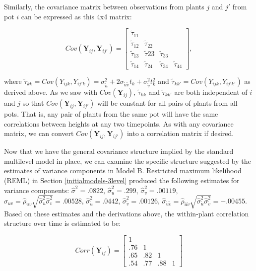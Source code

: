 \documentclass[
]{krantz}
\begin{document}
Similarly, the covariance matrix between observations from plants \(j\) and \(j'\) from pot \(i\) can be expressed as this 4x4 matrix:

\[  Cov(\textbf{Y}_{ij},\textbf{Y}_{ij'}) = \left[
          \begin{array}{cccc}
            \tilde{\tau}_{11} & & & \\
            \tilde{\tau}_{12} & \tilde{\tau}_{22} & & \\
            \tilde{\tau}_{13} & \tilde{\tau}{23} & \tilde{\tau}_{33} & \\
            \tilde{\tau}_{14} & \tilde{\tau}_{24} & \tilde{\tau}_{34} & \tilde{\tau}_{44}
          \end{array} \right], \]

where \(\tilde{\tau}_{kk}=Cov(Y_{ijk},Y_{ij'k})=\sigma_{\tilde{u}}^{2}+2\sigma_{\tilde{u}\tilde{v}}t_{k}+\sigma_{\tilde{v}}^{2}t_{k}^{2}\) and \(\tilde{\tau}_{kk'}=Cov(Y_{ijk},Y_{ij'k'})\) as derived above. As we saw with \(Cov(\textbf{Y}_{ij})\), \(\tilde{\tau}_{kk}\) and \(\tilde{\tau}_{kk'}\) are both independent of \(i\) and \(j\) so that \(Cov(\textbf{Y}_{ij},\textbf{Y}_{ij'})\) will be constant for all pairs of plants from all pots. That is, any pair of plants from the same pot will have the same correlations between heights at any two timepoints. As with any covariance matrix, we can convert \(Cov(\textbf{Y}_{ij},\textbf{Y}_{ij'})\) into a correlation matrix if desired.

Now that we have the general covariance structure implied by the standard multilevel model in place, we can examine the specific structure suggested by the estimates of variance components in Model B. Restricted maximum likelihood (REML) in Section \ref{initialmodels-3level} produced the following estimates for variance components: \(\hat{\sigma}^2=.0822\), \(\hat{\sigma}_{u}^{2}=.299\), \(\hat{\sigma}_{v}^{2}=.00119\), \(\hat{\sigma}_{uv}=\hat{\rho}_{uv}\sqrt{\hat{\sigma}_{u}^{2}\hat{\sigma}_{v}^{2}}=.00528\), \(\hat{\sigma}_{\tilde{u}}^{2}=.0442\), \(\hat{\sigma}_{\tilde{v}}^{2}=.00126\), \(\hat{\sigma}_{\tilde{u}\tilde{v}}=\hat{\rho}_{\tilde{u}\tilde{v}}\sqrt{\hat{\sigma}_{\tilde{u}}^{2}\hat{\sigma}_{\tilde{v}}^{2}}=-.00455\). Based on these estimates and the derivations above, the within-plant correlation structure over time is estimated to be:

\[  Corr(\textbf{Y}_{ij}) = \left[
          \begin{array}{cccc}
            1 & & & \\
            .76 & 1 & & \\
            .65 & .82 & 1 & \\
            .54 & .77 & .88 & 1
          \end{array} \right] \]
\end{document}

